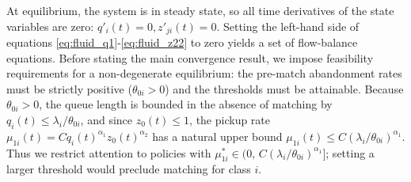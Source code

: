 At equilibrium, the system is in steady state, so all time derivatives of the state variables are zero: $q'_i(t)=0, z'_{ji}(t)=0$.
Setting the left-hand side of equations \eqref{eq:fluid_q1}-\eqref{eq:fluid_z22} to zero yields a set of flow-balance equations.
Before stating the main convergence result, we impose feasibility requirements for a non-degenerate equilibrium: the pre-match abandonment rates must be strictly positive ($\theta_{0i} > 0$) and the thresholds must be attainable.
Because $\theta_{0i}>0$, the queue length is bounded in the absence of matching by $q_i(t)\le \lambda_i/\theta_{0i}$, and since $z_0(t)\le 1$, the pickup rate $\mu_{1i}(t)=C q_i(t)^{\alpha_1} z_0(t)^{\alpha_2}$ has a natural upper bound $\mu_{1i}(t)\le C(\lambda_i/\theta_{0i})^{\alpha_1}$.
Thus we restrict attention to policies with $\mu_{1i}^*\in (0,\, C(\lambda_i/\theta_{0i})^{\alpha_1}]$; setting a larger threshold would preclude matching for class $i$.


